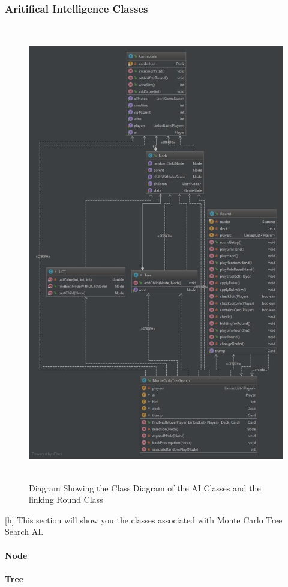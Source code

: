 \subsubsection{Aritifical Intelligence Classes}
\begin{figure}[h]
\centering
\includegraphics[width=15cm ,height=20cm,keepaspectratio]{AI_Classes}
\caption{Diagram Showing the Class Diagram of the AI Classes and the linking Round Class}
\end{figure}[h]
This section will show you the classes associated with Monte Carlo Tree Search AI. 
\paragraph{Node}

\paragraph{Tree}

